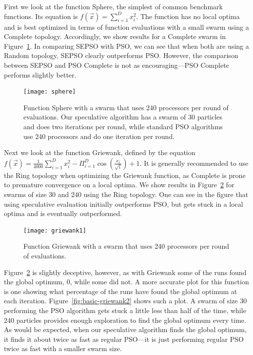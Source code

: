 \documentclass[journal,letterpaper]{IEEEtran}
\newcommand{\fig}[1]{Figure~\ref{fig:#1}}
\begin{document}
First we look at the function Sphere, the simplest of common benchmark
functions.  Its equation is $f(\Vec{x}) = \sum_{i=1}^D x_i^2$.  The function
has no local optima and is best optimized in terms of function evaluations with
a small swarm using a Complete topology.  Accordingly, we show results for a
Complete swarm in \fig{basic-sphere}.  In comparing SEPSO with PSO, we can see
that when both are using a Random topology, SEPSO clearly outperforms PSO.
However, the comparison between SEPSO and PSO Complete is not as
encouraging---PSO Complete performs slightly better.

\begin{figure}
  \centering
  \texttt{[image: sphere]}
  \caption{Function Sphere with a swarm that uses 240 processors per round of
  evaluations.  Our speculative algorithm has a swarm of 30 particles and does
  two iterations per round, while standard PSO algorithms use 240 processors
  and do one iteration per round.}
  \label{fig:basic-sphere}
\end{figure}

Next we look at the function Griewank, defined by the equation $f(\Vec{x}) =
\frac{1}{4000} \sum_{i=1}^D x_i^2 - \Pi_{i=1}^D \cos\left(\frac{x_i}{\sqrt{i}}
\right) + 1$.  It is generally recommended to use the Ring topology when
optimizing the Griewank function, as Complete is prone to premature convergence
on a local optima.  We show results in \fig{basic-griewank1} for swarms of size
30 and 240 using the Ring topology. One can see in the figure that using
speculative evaluation initially outperforms PSO, but gets stuck in a local
optima and is eventually outperformed.  

\begin{figure}
  \centering
  \texttt{[image: griewank1]}
  \caption{Function Griewank with a swarm that uses 240 processors per round of
  evaluations.}
  \label{fig:basic-griewank1}
\end{figure}

\fig{basic-griewank1} is slightly deceptive, however, as with Griewank some of
the runs found the global optimum, 0, while some did not.  A more accurate plot
for this function is one showing what percentage of the runs have found the
global optimum at each iteration.  \fig{basic-griewank2} shows such a plot.  A
swarm of size 30 performing the PSO algorithm gets stuck a little less than
half of the time, while 240 particles provides enough exploration to find the
global optimum every time.  As would be expected, when our speculative
algorithm finds the global optimum, it finds it about twice as fast as regular
PSO---it is just performing regular PSO twice as fast with a smaller swarm
size.
\end{document}
